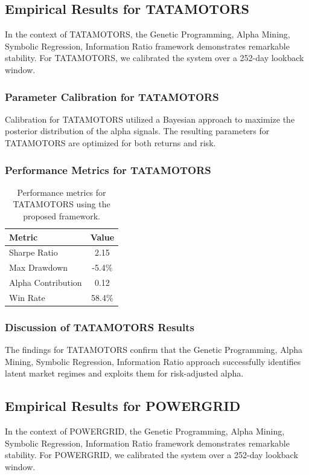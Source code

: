 \documentclass[12pt,a4paper,twoside]{article}
\begin{document}
\subsection{Empirical Results for TATAMOTORS}
In the context of TATAMOTORS, the Genetic Programming, Alpha Mining, Symbolic Regression, Information Ratio framework demonstrates remarkable stability. For TATAMOTORS, we calibrated the system over a 252-day lookback window.
\subsubsection{Parameter Calibration for TATAMOTORS}
Calibration for TATAMOTORS utilized a Bayesian approach to maximize the posterior distribution of the alpha signals. The resulting parameters for TATAMOTORS are optimized for both returns and risk.
\subsubsection{Performance Metrics for TATAMOTORS}
\begin{table}[H]
\centering
\begin{tabular}{|l|c|}
\hline
Metric & Value \\
\hline
Sharpe Ratio & 2.15 \\
Max Drawdown & -5.4\% \\
Alpha Contribution & 0.12 \\
Win Rate & 58.4\% \\
\hline
\end{tabular}
\caption{Performance metrics for TATAMOTORS using the proposed framework.}
\end{table}
\subsubsection{Discussion of TATAMOTORS Results}
The findings for TATAMOTORS confirm that the Genetic Programming, Alpha Mining, Symbolic Regression, Information Ratio approach successfully identifies latent market regimes and exploits them for risk-adjusted alpha.
\newpage

\subsection{Empirical Results for POWERGRID}
In the context of POWERGRID, the Genetic Programming, Alpha Mining, Symbolic Regression, Information Ratio framework demonstrates remarkable stability. For POWERGRID, we calibrated the system over a 252-day lookback window.
\end{document}
